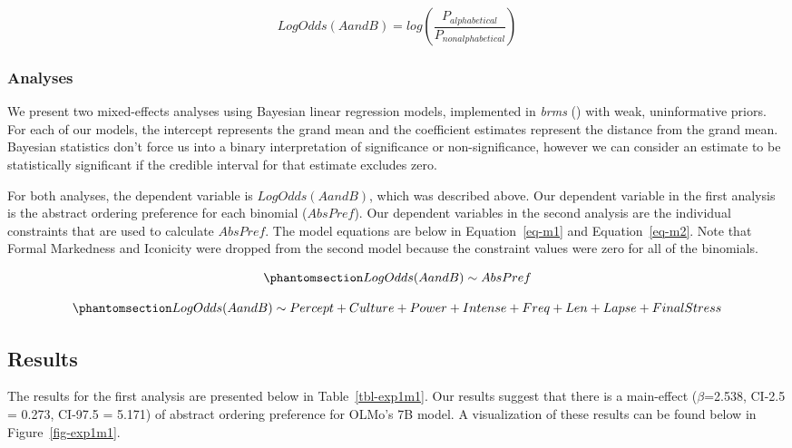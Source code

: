 \documentclass[
  nottoc]{article}
\begin{document}
\[
LogOdds(AandB) = log(\frac{P_{alphabetical}}{P_{nonalphabetical}})
\]

\subsubsection{Analyses}\label{analyses}

We present two mixed-effects analyses using Bayesian linear regression
models, implemented in \emph{brms} ()
with weak, uninformative priors. For each of our models, the intercept
represents the grand mean and the coefficient estimates represent the
distance from the grand mean. Bayesian statistics don't force us into a
binary interpretation of significance or non-significance, however we
can consider an estimate to be statistically significant if the credible
interval for that estimate excludes zero.

For both analyses, the dependent variable is \(LogOdds(AandB)\), which
was described above. Our dependent variable in the first analysis is the
abstract ordering preference for each binomial (\(AbsPref\)). Our
dependent variables in the second analysis are the individual
constraints that are used to calculate \(AbsPref\). The model equations
are below in Equation~\ref{eq-m1} and Equation~\ref{eq-m2}. Note that
Formal Markedness and Iconicity were dropped from the second model
because the constraint values were zero for all of the binomials.

\begin{equation}\phantomsection\label{eq-m1}{
LogOdds(AandB) \sim AbsPref
}\end{equation}

\begin{equation}\phantomsection\label{eq-m2}{
LogOdds(AandB) \sim Percept + Culture + Power + Intense + Freq + Len + Lapse + FinalStress
}\end{equation}

\subsection{Results}\label{results}

The results for the first analysis are presented below in
Table~\ref{tbl-exp1m1}. Our results suggest that there is a main-effect
(\(\beta\)=2.538, CI-2.5 = 0.273, CI-97.5 = 5.171) of abstract ordering
preference for OLMo's 7B model. A visualization of these results can be
found below in Figure~\ref{fig-exp1m1}.
\end{document}
